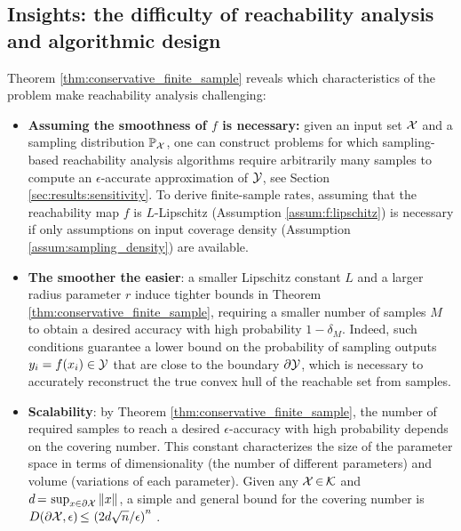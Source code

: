 \documentclass[12pt]{l4dc2022} %
\begin{document}
\subsection{Insights: the difficulty of reachability analysis and  algorithmic design}\label{sec:finite_sample:insights}
Theorem \ref{thm:conservative_finite_sample} reveals which characteristics of the problem make reachability analysis challenging: 
\begin{itemize}[leftmargin=4.5mm]
  \setlength\itemsep{0.0mm}%
    
    \item \textbf{Assuming the smoothness of $f$ is necessary:} %
    given an input set $\mathcal{X}$ and a sampling distribution $\mathbb{P}_{\mathcal{X}}$, %
    one can construct problems for which sampling-based reachability analysis algorithms require arbitrarily many samples to compute an $\epsilon$-accurate approximation of $\mathcal{Y}$, see Section \ref{sec:results:sensitivity}. To derive finite-sample rates, assuming that the reachability map $f$ is $L$-Lipschitz (Assumption \ref{assum:f:lipschitz}) is necessary if only  assumptions on input coverage density (Assumption \ref{assum:sampling_density}) are available.
   
    \item \textbf{The smoother the easier}: 
a smaller Lipschitz constant $L$ 
% 
and a larger radius parameter $r$ 
% 
induce 
tighter bounds in Theorem \ref{thm:conservative_finite_sample}, requiring a smaller number of samples $M$ to obtain a desired accuracy with high probability $1-\delta_M$. 
% 
% 
Indeed, such conditions guarantee a lower bound on the probability of sampling outputs $y_i=f(x_i)\in\mathcal{Y}$ that are close to the boundary $\partial\mathcal{Y}$, which is necessary to accurately reconstruct the true convex hull of the reachable set from samples.

% 
% 
% 
% 

    
    \item \textbf{Scalability}: by Theorem \ref{thm:conservative_finite_sample}, the number of required samples to reach a desired  $\epsilon$-accuracy with high probability depends on the covering number. This constant characterizes the size of the parameter space 
    in terms of dimensionality 
    (the number of different parameters) and volume (variations of each parameter). 
    Given any $\mathcal{X}\,{\in}\,\mathcal{K}$ and $d\,{=}\,\sup_{x\in\partial\mathcal{X}}\|x\|$, a simple and general bound for the covering number is  
    $
    D(\partial\mathcal{X},\epsilon)
    \,{\leq}\,
    \left(
    2d\sqrt{n}/\epsilon
    \right)^n
    $ \citep{ShalevShwartz2009}.
    
\end{itemize}
\end{document}
